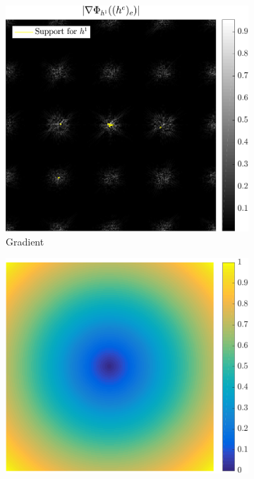 \begin{figure}[!ht] \centering
\begin{subfigure}[b]{0.325\textwidth}\centering
\includegraphics[width=1\textwidth]{figures/tree-scattered-supports/grad_node1.pdf}
\caption{Gradient }\label{}
\end{subfigure}
\begin{subfigure}[b]{0.325\textwidth}\centering
\includegraphics[width=1\textwidth]{figures/tree-scattered-supports/dist_to_orig.pdf}

\end{subfigure}
\end{figure}
